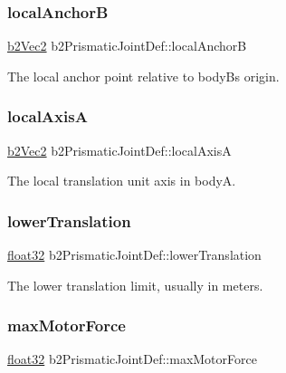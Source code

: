 \subsubsection{\texorpdfstring{localAnchorB}{localAnchorB}}
{\footnotesize\ttfamily \mbox{\hyperlink{structb2_vec2}{b2\+Vec2}} b2\+Prismatic\+Joint\+Def\+::local\+AnchorB}



The local anchor point relative to bodyB\textquotesingle{}s origin. 

\mbox{\label{structb2_prismatic_joint_def_af36fdbcedca5a392a2649cd235c42676}} 
\subsubsection{\texorpdfstring{localAxisA}{localAxisA}}
{\footnotesize\ttfamily \mbox{\hyperlink{structb2_vec2}{b2\+Vec2}} b2\+Prismatic\+Joint\+Def\+::local\+AxisA}



The local translation unit axis in bodyA. 

\mbox{\label{structb2_prismatic_joint_def_ac0a0e2a669d640ebea354895fe6a9fb6}} 
\subsubsection{\texorpdfstring{lowerTranslation}{lowerTranslation}}
{\footnotesize\ttfamily \mbox{\hyperlink{b2_settings_8h_aacdc525d6f7bddb3ae95d5c311bd06a1}{float32}} b2\+Prismatic\+Joint\+Def\+::lower\+Translation}



The lower translation limit, usually in meters. 

\mbox{\label{structb2_prismatic_joint_def_aabeec48af1e49c7f9fed5e0bc8270a1b}} 
\subsubsection{\texorpdfstring{maxMotorForce}{maxMotorForce}}
{\footnotesize\ttfamily \mbox{\hyperlink{b2_settings_8h_aacdc525d6f7bddb3ae95d5c311bd06a1}{float32}} b2\+Prismatic\+Joint\+Def\+::max\+Motor\+Force}




